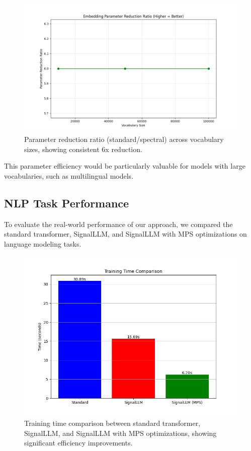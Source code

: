 \documentclass[10pt,twocolumn,letterpaper]{article}
\begin{document}
\begin{figure}[t]
    \centering
    \includegraphics[width=0.9\linewidth]{report_assets/parameter_ratio.png}
    \caption{Parameter reduction ratio (standard/spectral) across vocabulary sizes, showing consistent 6x reduction.}
    \label{fig:ratio}
\end{figure}

This parameter efficiency would be particularly valuable for models with large vocabularies, such as multilingual models.

\subsection{NLP Task Performance}

To evaluate the real-world performance of our approach, we compared the standard transformer, SignalLLM, and SignalLLM with MPS optimizations on language modeling tasks.

\begin{figure}[t]
    \centering
    \includegraphics[width=0.9\linewidth]{report_assets/training_time.png}
    \caption{Training time comparison between standard transformer, SignalLLM, and SignalLLM with MPS optimizations, showing significant efficiency improvements.}
    \label{fig:training_time}
\end{figure}
\end{document}
